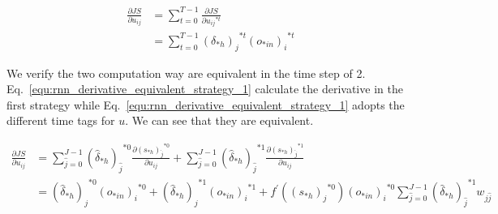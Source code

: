 \documentclass[runningheads,openany]{xhlPaper}
\begin{document}
\begin{equation}
\label{equ:rnn_derivative_u_sum_t}
\begin{aligned}
\frac{{\partial JS}}{{\partial {u_{ij}}}} &= \sum\limits_{t = 0}^{T - 1} {\frac{{\partial JS}}{{\partial {u_{ij}}^{*t}}}} \\
 &= \sum\limits_{t = 0}^{T - 1} {{{\left( {{\delta _{*h}}} \right)}_j}^{*t}{{\left( {{o_{*in}}} \right)}_i}^{*t}} 
\end{aligned}
\end{equation}

We verify the two computation way are equivalent in the time step of 2. Eq.~\ref{equ:rnn_derivative_equivalent_strategy_1} calculate the derivative in the first strategy while Eq.~\ref{equ:rnn_derivative_equivalent_strategy_1} adopts the different time tags for $u$. We can see that they are equivalent.

\begin{equation}
\label{equ:rnn_derivative_equivalent_strategy_1}
\begin{aligned}
\frac{{\partial JS}}{{\partial {u_{ij}}}} &= \sum\limits_{\hat j = 0}^{J - 1} {{{\left( {{{\hat \delta }_{*h}}} \right)}_{\hat j}}^{*0}\frac{{\partial {{\left( {{s_{*h}}} \right)}_{\hat j}}^{*0}}}{{\partial {u_{ij}}}}}  + \sum\limits_{\hat j = 0}^{J - 1} {{{\left( {{{\hat \delta }_{*h}}} \right)}_{\hat j}}^{*1}\frac{{\partial {{\left( {{s_{*h}}} \right)}_{\hat j}}^{*1}}}{{\partial {u_{ij}}}}} \\
 &= {\left( {{{\hat \delta }_{*h}}} \right)_j}^{*0}{\left( {{o_{*in}}} \right)_i}^{*0} + {\left( {{{\hat \delta }_{*h}}} \right)_j}^{*1}{\left( {{o_{*in}}} \right)_i}^{*1} + {f^{'}}\left( {{{\left( {{s_{*h}}} \right)}_j}^{*0}} \right){\left( {{o_{*in}}} \right)_i}^{*0}\sum\limits_{\hat j = 0}^{J - 1} {{{\left( {{{\hat \delta }_{*h}}} \right)}_{\hat j}}^{*1}} {w_{j\hat j}}
\end{aligned}
\end{equation}
\end{document}
